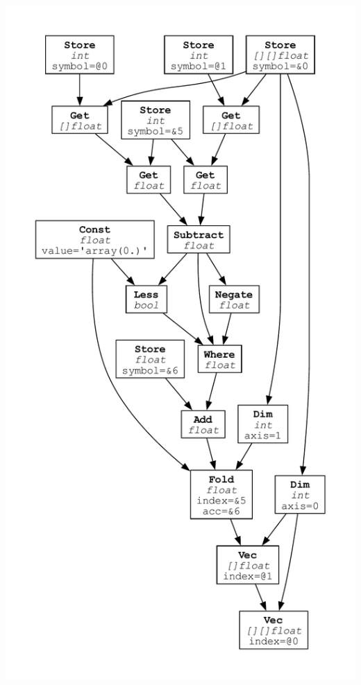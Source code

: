 \begin{center}
    \includegraphics[height=.53\textheight]{Sources/term-graphs/phi.pdf}    

\end{center}
